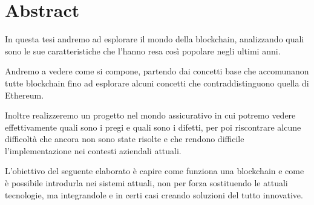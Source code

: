 \chapter*{Abstract}
\label{cha:abstract}

In questa tesi andremo ad esplorare il mondo della blockchain, analizzando
quali sono le sue caratteristiche che l'hanno resa così popolare negli ultimi 
anni.

Andremo a vedere come si compone, partendo dai concetti base
che accomunanon tutte blockchain fino ad esplorare alcuni concetti che 
contraddistinguono quella di Ethereum. 

Inoltre realizzeremo un progetto nel mondo assicurativo in cui potremo
vedere effettivamente quali sono i pregi e quali sono i difetti, per poi
riscontrare alcune difficoltà che ancora non sono state risolte e che rendono
difficile l'implementazione nei contesti aziendali attuali.

L'obiettivo del seguente elaborato è capire come funziona una blockchain e come
è possibile introdurla nei sistemi attuali, non per forza sostituendo le
attuali tecnologie, ma integrandole e in certi casi creando soluzioni del tutto
innovative.
